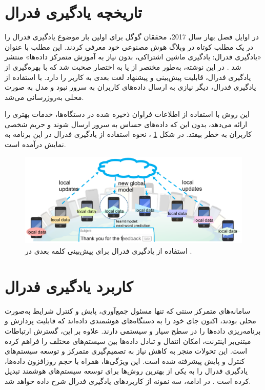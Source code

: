 \section{تاریخچه یادگیری فدرال}


در اوایل فصل بهار سال 2017، محققان گوگل
برای اولین بار موضوع یادگیری فدرال را در یک مطلب کوتاه در وبلاگ هوش مصنوعی خود معرفی کردند. این مطلب با عنوان «یادگیری فدرال: یادگیری ماشین اشتراکی، بدون نیاز به آموزش متمرکز داده‌ها» منتشر شد
\cite{mcmahan2017federated}.
در این نوشته، به‌طور مختصر از
یا به اختصار
صحبت شد که با بهره‌گیری از یادگیری فدرال، قابلیت پیش‌بینی و پیشنهاد لغت بعدی به کاربر را دارد. با استفاده از یادگیری فدرال، دیگر نیازی به ارسال داده‌های کاربران به سرور نبود و مدل به ‌صورت محلی به‌روزرسانی می‌شد.

این روش با استفاده از اطلاعات فراوان ذخیره شده در دستگاه‌ها، خدمات بهتری را ارائه می‌دهد، بدون این که داده‌های حساس به سرور ارسال شوند و حریم شخصی کاربران به خطر بیفتد. در شکل
\ref{gboard}%
، نحوه استفاده از یادگیری فدرال در این برنامه به نمایش درآمده است.


 \begin{figure}[b!]
	\centering
	\includegraphics[scale=1]{images/chap1/gboard.png}%
	\caption{%
استفاده از یادگیری فدرال برای پیش‌بینی کلمه بعدی در
		\cite{li2020federated}%
		.
	}
	\label{gboard}
	\centering
\end{figure}



\section{کاربرد یادگیری فدرال}
سامانه‌های متمرکز سنتی که تنها مسئول جمع‌آوری، پایش و کنترل شرایط به‌صورت محلی بودند، اکنون جای خود را به دستگاه‌های هوشمندی داده‌اند که قابلیت پردازش و برنامه‌ریزی داده‌ها را در سطح سیار و سیستمی دارند. علاوه بر این، گسترش ارتباطات مبتنی‌بر اینترنت، امکان انتقال و تبادل داده‌ها بین سیستم‌های مختلف را فراهم کرده است. این تحولات منجر به کاهش نیاز به تصمیم‌گیری متمرکز و توسعه سیستم‌های کنترل و پایش پیشرفته شده است. این ویژگی‌ها، همراه با حجم روزافزون داده‌ها، یادگیری فدرال را به یکی از بهترین روش‌ها برای توسعه سیستم‌های هوشمند تبدیل کرده است
\cite{mahtab2022algorithm}.
در ادامه، سه نمونه از کاربردهای یادگیری فدرال شرح داده خواهد شد.


